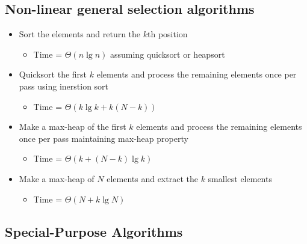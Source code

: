 \documentclass[12pt]{article}
\begin{document}
\subsection{Non-linear general selection algorithms}

\begin{itemize}
    \item Sort the elements and return the $k$th position
        \begin{itemize}
            \item Time = $\Theta(n\lg n)$ assuming quicksort or heapsort
        \end{itemize}
    \item Quicksort the first $k$ elements and process the remaining
    elements once per pass using inerstion sort
        \begin{itemize}
            \item Time = $\Theta(k\lg k+k(N-k))$
        \end{itemize}
    \item Make a max-heap of the first $k$ elements and process the remaining
    elements once per pass maintaining max-heap property
        \begin{itemize}
            \item Time = $\Theta(k+(N-k)\lg k)$
        \end{itemize}
    \item Make a max-heap of $N$ elements and extract the $k$ smallest
    elements
        \begin{itemize}
            \item Time = $\Theta(N+k\lg N)$
        \end{itemize}
\end{itemize}

\subsection{Special-Purpose Algorithms}
\end{document}
